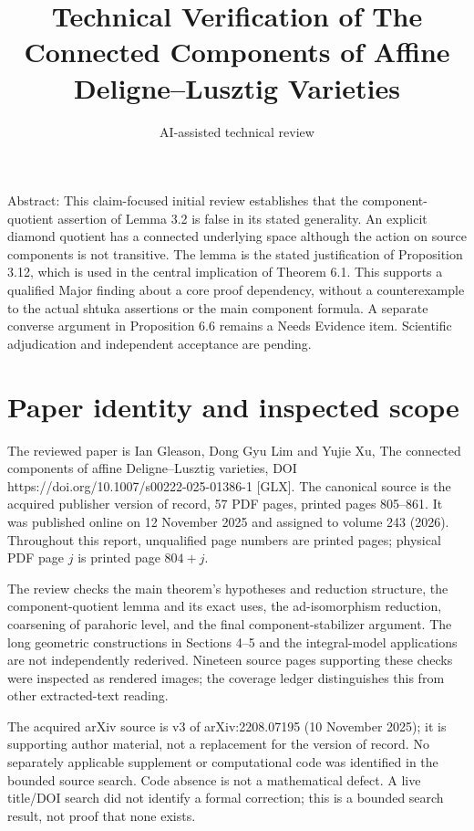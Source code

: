 \documentclass[10pt]{article}
\title{Technical Verification of
The Connected Components of Affine Deligne–Lusztig Varieties}
\author{AI-assisted technical review}
\date{}
\begin{document}
\maketitle
Abstract: This claim-focused initial review establishes that the component-quotient assertion of Lemma 3.2 is false in its stated generality. An explicit diamond quotient has a connected underlying space although the action on source components is not transitive. The lemma is the stated justification of Proposition 3.12, which is used in the central implication of Theorem 6.1. This supports a qualified Major finding about a core proof dependency, without a counterexample to the actual shtuka assertions or the main component formula. A separate converse argument in Proposition 6.6 remains a Needs Evidence item. Scientific adjudication and independent acceptance are pending.\par
\section*{Paper identity and inspected scope}
The reviewed paper is Ian Gleason, Dong Gyu Lim and Yujie Xu, The connected components of affine Deligne–Lusztig varieties, DOI https://doi.org/10.1007/s00222-025-01386-1 [GLX]. The canonical source is the acquired publisher version of record, 57 PDF pages, printed pages 805–861. It was published online on 12 November 2025 and assigned to volume 243 (2026). Throughout this report, unqualified page numbers are printed pages; physical PDF page \(j\) is printed page \(804+j\).\par
The review checks the main theorem’s hypotheses and reduction structure, the component-quotient lemma and its exact uses, the ad-isomorphism reduction, coarsening of parahoric level, and the final component-stabilizer argument. The long geometric constructions in Sections 4–5 and the integral-model applications are not independently rederived. Nineteen source pages supporting these checks were inspected as rendered images; the coverage ledger distinguishes this from other extracted-text reading.\par
The acquired arXiv source is v3 of arXiv:2208.07195 (10 November 2025); it is supporting author material, not a replacement for the version of record. No separately applicable supplement or computational code was identified in the bounded source search. Code absence is not a mathematical defect. A live title/DOI search did not identify a formal correction; this is a bounded search result, not proof that none exists.\par
\end{document}
